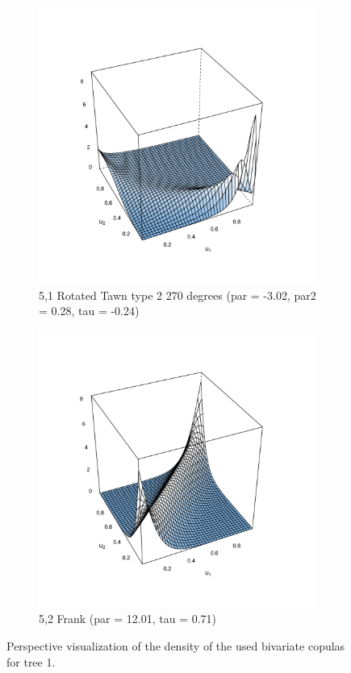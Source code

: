 \documentclass{article}
\begin{document}
\begin{samepage}
\begin{figure}[h]
  \begin{subfigure}[b]{0.475\textwidth}
    \centering
    \includegraphics[width=\textwidth]{3}
    \caption[]%
    {{\small 5,1 Rotated Tawn type 2 270 degrees (par = -3.02, par2 =
        0.28, tau = -0.24)}}
    \label{fig:c}
  \end{subfigure}
  \hfill
  \begin{subfigure}[b]{0.475\textwidth}
    \centering
    \includegraphics[width=\textwidth]{4}
    \caption[]%
    {{\small 5,2 Frank (par = 12.01, tau = 0.71)}}
    \label{fig:d}
  \end{subfigure}
  \caption[ Global caption ]
  {\small Perspective visualization of the density of the used
    bivariate copulas for tree 1.}
  \label{fig:test-figure}
\end{figure}
\end{samepage}
\clearpage
\end{document}
